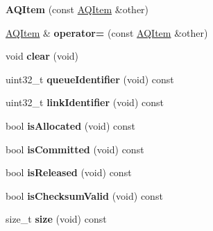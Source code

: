 \begin{DoxyCompactItemize}
\item 
{\bfseries A\+Q\+Item} (const \hyperlink{class_a_q_item}{A\+Q\+Item} \&other)\hypertarget{class_a_q_item_a97f5c3ef3f493c5c6df7a2dd4cc0d4b5}{}\label{class_a_q_item_a97f5c3ef3f493c5c6df7a2dd4cc0d4b5}

\item 
\hyperlink{class_a_q_item}{A\+Q\+Item} \& {\bfseries operator=} (const \hyperlink{class_a_q_item}{A\+Q\+Item} \&other)\hypertarget{class_a_q_item_a780c92d7ed552d69ac2a692d09ca3a2b}{}\label{class_a_q_item_a780c92d7ed552d69ac2a692d09ca3a2b}

\item 
void {\bfseries clear} (void)\hypertarget{class_a_q_item_ae169220dd19f29c74d891935d2d9d4b8}{}\label{class_a_q_item_ae169220dd19f29c74d891935d2d9d4b8}

\item 
uint32\+\_\+t {\bfseries queue\+Identifier} (void) const \hypertarget{class_a_q_item_a33029e27ef81601694a987648cd09f67}{}\label{class_a_q_item_a33029e27ef81601694a987648cd09f67}

\item 
uint32\+\_\+t {\bfseries link\+Identifier} (void) const \hypertarget{class_a_q_item_a8e2e1414d09863cf3b733119a068dbb8}{}\label{class_a_q_item_a8e2e1414d09863cf3b733119a068dbb8}

\item 
bool {\bfseries is\+Allocated} (void) const \hypertarget{class_a_q_item_a21513e2a0208dbbd000c1821913ff595}{}\label{class_a_q_item_a21513e2a0208dbbd000c1821913ff595}

\item 
bool {\bfseries is\+Committed} (void) const \hypertarget{class_a_q_item_a09f66df9383cbeec05990270d2517397}{}\label{class_a_q_item_a09f66df9383cbeec05990270d2517397}

\item 
bool {\bfseries is\+Released} (void) const \hypertarget{class_a_q_item_ac3eb62c6b4c6dee0c2afafafd8bea06f}{}\label{class_a_q_item_ac3eb62c6b4c6dee0c2afafafd8bea06f}

\item 
bool {\bfseries is\+Checksum\+Valid} (void) const \hypertarget{class_a_q_item_a2313675d412d90c4b54da718dbd487fc}{}\label{class_a_q_item_a2313675d412d90c4b54da718dbd487fc}

\item 
size\+\_\+t {\bfseries size} (void) const \hypertarget{class_a_q_item_a346237d15617f812d325c173f21892b9}{}\label{class_a_q_item_a346237d15617f812d325c173f21892b9}


\end{DoxyCompactItemize}
